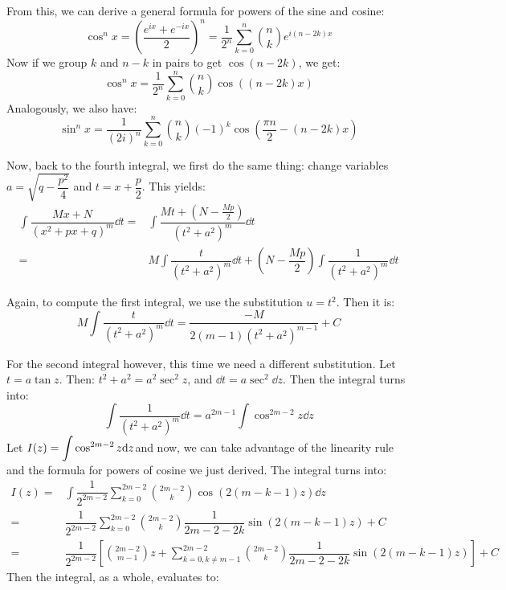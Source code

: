 \documentclass[12pt]{article}
\begin{document}
    From this, we can derive a general formula for powers of the sine and cosine:
    \begin{equation*}
        \cos ^n x =  \left(\dfrac{e^{ix}+e^{-ix}}{2}\right) ^n 
        =  \dfrac{1}{2^n} \sum_{k=0}^{n}\binom{n}{k}e^{i(n-2k)x}
    \end{equation*}
    Now if we group $k$ and $n-k$ in pairs to get $\cos(n-2k)$, we get:
    \begin{equation*}
        \cos ^n x = \dfrac{1}{2^n} \sum_{k=0}^{n} \binom{n}{k} \cos ((n-2k)x)
    \end{equation*}
    Analogously, we also have:
    \begin{equation*}
                \sin ^n x = \dfrac{1}{(2i)^n} \sum_{k=0}^{n} \binom{n}{k} (-1)^k \cos (\dfrac{\pi n}{2}-(n-2k)x)
    \end{equation*}
    \par Now, back to the fourth integral, we first do the same thing: change variables $a = \sqrt{q-\dfrac{p^2}{4}}$ and $t = x + \dfrac{p}{2}$. This yields:
    \begin{align*}
        \int \dfrac{Mx+N}{(x^2 + px + q)^m} \dd t= & \int \dfrac{Mt + (N - \frac{Mp}{2})}{(t^2 + a^2)^m} \dd t \\
        = & M\int \dfrac{t}{(t^2 + a^2)^m} \dd t + \left(N-\dfrac{Mp}{2}\right) \int \dfrac{1}{(t^2 + a^2)^m} \dd t
    \end{align*}
    \par Again, to compute the first integral, we use the substitution $u = t^2$. Then it is:
    \begin{equation*}
        M\int \dfrac{t}{(t^2 + a^2)^m} \dd t = \dfrac{-M}{2(m-1)(t^2 + a^2)^{m-1}} +C
    \end{equation*}
    \par For the second integral however, this time we need a different substitution. Let $t = a\tan z$. Then: $t^2 +a ^2 = a^2 \sec ^2 z$, and $\dd t = a\sec ^2 \dd z$.
    Then the integral turns into:
    \begin{equation*}
        \int \dfrac{1}{(t^2 + a^2)^m} \dd t = a^{2m-1} \int \cos ^{2m-2} z \dd z
    \end{equation*}
    Let $I(z) = \mathlarger{\int \cos ^{2m-2} z \dd z} $and now, we can take advantage of the linearity rule and the formula for powers of cosine we just derived. The integral turns into:
    \begin{align*}
        I(z) = & \int \dfrac{1}{2^{2m-2}} \sum_{k=0}^{2m-2} \binom{2m-2}{k}\cos(2(m-k-1)z) \dd z \\
        = & \dfrac{1}{2^{2m-2}} \sum_{k=0}^{2m-2} \binom{2m-2}{k} \dfrac{1}{2m-2-2k} \sin ( 2(m-k-1)z) +C \\
        = & \dfrac{1}{2^{2m-2}} \left[ \binom{2m-2}{m-1}z + \sum_{k=0, k\neq m-1}^{2m-2} \binom{2m-2}{k} \dfrac{1}{2m-2-2k} \sin ( 2(m-k-1)z)\right] +C
    \end{align*}
    Then the integral, as a whole, evaluates to:
\end{document}
